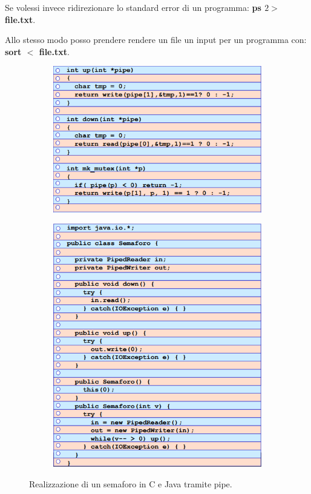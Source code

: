 Se volessi invece ridirezionare lo standard error di un programma: \textbf{ps $2>$ file.txt}.

Allo stesso modo posso prendere rendere un file un input per un programma con: \textbf{sort $<$ file.txt}.

\begin{figure}[!ht]
    \begin{subfigure}{.5\textwidth}
    \centering
      \includegraphics[width=1\linewidth]{assets/semaforoUno8.png}
    \end{subfigure}%
    \begin{subfigure}{.5\textwidth}
    \centering
      \includegraphics[width=0.9\linewidth]{assets/semaforoDue8.png}
    \end{subfigure}
    \caption{Realizzazione di un semaforo in C e Java tramite pipe.}
  \end{figure}

